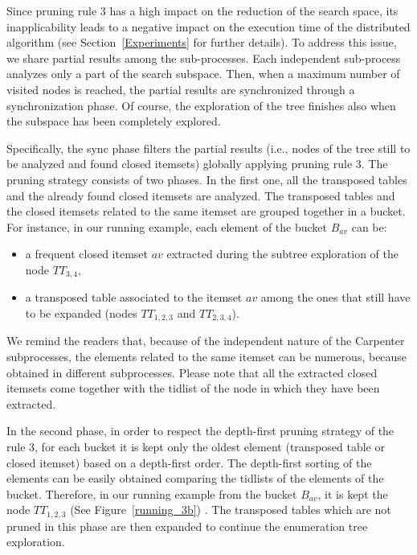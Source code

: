 Since pruning rule 3 has a high impact on the reduction of the search space, its
inapplicability leads to a negative
impact on the execution time of the distributed algorithm (see Section~\ref{Experiments} for further details).
To address this issue, we share partial results among the sub-processes.
Each independent sub-process analyzes only a part of the search subspace.
Then, when a maximum number of visited nodes is reached, the partial results are
synchronized through a synchronization phase. Of course, the exploration of the
tree finishes also when the subspace has been completely explored.

Specifically, the sync phase filters the partial results (i.e., nodes of the tree
still to be analyzed and found closed itemsets) globally applying pruning rule
3. The pruning strategy consists of two phases.
In the first one, all the transposed tables and the already found closed
itemsets are analyzed. The transposed tables and the closed itemsets related to
the same itemset are grouped together in a bucket. For instance, in our running
example, each element of the bucket $B_{av}$ can be:
\begin{itemize}
\item a frequent closed itemset $av$ extracted during the subtree exploration of
the node $TT_{3, 4}$,
\item a transposed table associated to the itemset $av$ among the ones that
still have to be expanded (nodes  $TT_{1, 2, 3}$ and  $TT_{2, 3, 4}$).
\end{itemize}
We remind the readers that, because of the independent nature of the Carpenter
subprocesses, the elements related to the same itemset can be numerous, because
obtained in different subprocesses. Please note that all the extracted closed
itemsets come together with the tidlist of the node in which they have been
extracted.

In the second phase, in order to respect the depth-first pruning strategy of the
rule 3, for each bucket it is kept only the oldest element (transposed table or
closed itemset) based on a depth-first order. The depth-first sorting of the
elements can be easily obtained comparing the tidlists of the elements of the
bucket.
Therefore, in our running example from the
bucket $B_{av}$, it is kept the node $TT_{1, 2, 3}$ (See Figure~\ref{running_3b}) .
The transposed tables which are not pruned in this phase are then expanded to continue the enumeration tree exploration.


